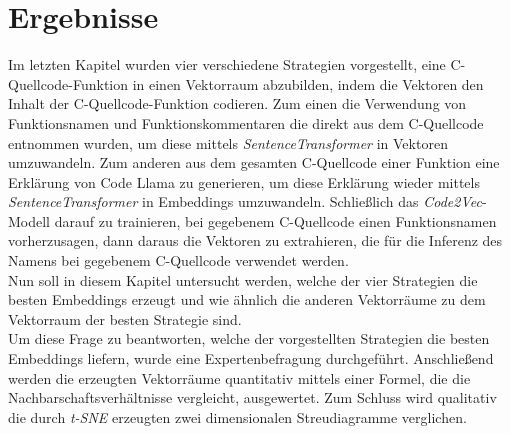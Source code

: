 \documentclass[12pt,letterpaper,ngerman]{article}
\begin{document}
\section{Ergebnisse}
Im letzten Kapitel wurden vier verschiedene Strategien vorgestellt,
eine C-Quellcode-Funktion in einen Vektorraum abzubilden, indem 
die Vektoren den Inhalt der C-Quellcode-Funktion codieren.
Zum einen die Verwendung von Funktionsnamen und Funktionskommentaren 
die direkt aus dem C-Quellcode entnommen wurden, um diese mittels
\textit{SentenceTransformer} in Vektoren umzuwandeln. Zum anderen
aus dem gesamten C-Quellcode einer
Funktion eine Erklärung von Code Llama zu generieren, um diese 
Erklärung wieder mittels \textit{SentenceTransformer} in Embeddings
umzuwandeln. Schließlich das \textit{Code2Vec}-Modell darauf zu
trainieren,
bei gegebenem C-Quellcode einen Funktionsnamen vorherzusagen, dann 
daraus die Vektoren zu extrahieren, die für die Inferenz des Namens
bei gegebenem C-Quellcode verwendet werden.\\
Nun soll in diesem Kapitel untersucht werden, welche der vier 
Strategien
die besten Embeddings erzeugt und wie ähnlich die anderen 
Vektorräume zu dem Vektorraum der besten Strategie
sind.\\
Um diese Frage zu beantworten, welche der vorgestellten Strategien
die besten Embeddings liefern, wurde eine Expertenbefragung 
durchgeführt. Anschließend werden die erzeugten Vektorräume quantitativ
mittels einer Formel, die die Nachbarschaftsverhältnisse vergleicht, 
ausgewertet.
Zum Schluss wird qualitativ die durch \textit{t-SNE} erzeugten
zwei dimensionalen Streudiagramme verglichen.
\end{document}
